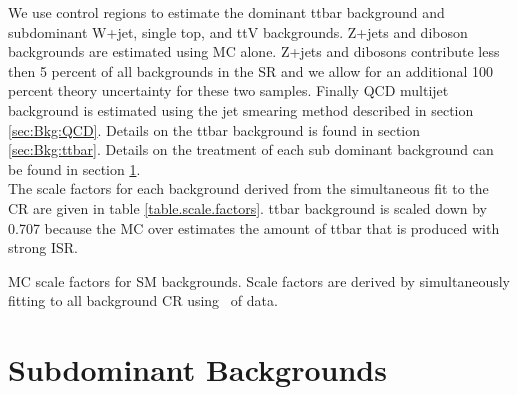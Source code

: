 

\indent We use control regions to estimate the dominant ttbar background and subdominant W+jet, single top, and ttV backgrounds.  Z+jets and diboson backgrounds are estimated using MC alone.  Z+jets and dibosons contribute less then 5 percent of all backgrounds in the SR and we allow for an additional 100 percent theory uncertainty for these two samples.   Finally QCD multijet background is estimated using the jet smearing method described in section \ref{sec:Bkg:QCD}. Details on the ttbar background is found in section \ref{sec:Bkg:ttbar}. Details on the treatment of each sub dominant background can be found in section \ref{sec:Bkg:sub}.\\

\indent The scale factors for each background derived from the simultaneous fit to the CR are given in table \ref{table.scale.factors}. ttbar background is scaled down by 0.707 because the MC over estimates the amount of ttbar that is produced with strong ISR. \\

\begin{table}
  \begin{center}
    
  \end{center}
  \caption{MC scale factors for SM backgrounds.  Scale factors are derived by simultaneously fitting to all background CR using \intlumi\ \ifb of data.}
  \label{table.scale.factors}
\end{table}



\section{Subdominant Backgrounds}
\label{sec:Bkg:sub}






